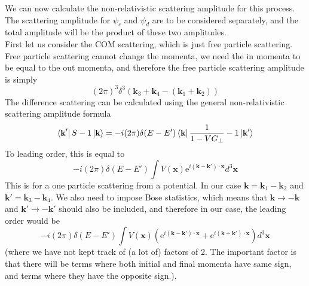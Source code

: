 \documentclass[11pt, notitlepage]{report}
\newcommand{\e}{\mathrm{e}}
\numberwithin{equation}{section}
\begin{document}
    We can now calculate the non-relativistic scattering amplitude for this process. The scattering amplitude for \(\psi_c\) and \(\psi_d\) are to be considered separately, and the total amplitude will be the product of these two amplitudes. \\
    First let us consider the COM scattering, which is just free particle scattering. Free particle scattering cannot change the momenta, we need the in momenta to be equal to the out momenta, and therefore the free particle scattering amplitude is simply 
    \begin{equation*}
        (2\pi)^3\delta^3(\textbf{k}_3 +  \textbf{k}_4 - (\textbf{k}_1 + \textbf{k}_2))
    \end{equation*}
    The difference scattering can be calculated using the general non-relativistic scattering amplitude formula 
    \begin{equation*}
        \bra{\textbf{k}'}S-1\ket{\textbf{k}} = -i(2\pi)\delta(E - E') \bra{\textbf{k}} \frac{1}{1 - VG_\perp} -1 \ket{\textbf{k}'}
    \end{equation*}
    To leading order, this is equal to 
    \begin{equation*}
        -i(2\pi)\delta(E - E') \int V(\textbf{x}) \e^{i(\textbf{k} - \textbf{k}')\cdot \textbf{x}}d^3\textbf{x}
    \end{equation*}
    This is for a one particle scattering from a potential. In our case \(\textbf{k} = \textbf{k}_1 - \textbf{k}_2\) and \(\textbf{k}' = \textbf{k}_3 - \textbf{k}_4\). We also need to impose Bose statistics, which means that \(\textbf{k}\to -\textbf{k}\) and \(\textbf{k}' \to -\textbf{k}'\) should also be included, and therefore in our case, the leading order would be 
    \begin{equation*}
        -i(2\pi)\delta(E - E') \int V(\textbf{x}) \left( \e^{i(\textbf{k} - \textbf{k}') \cdot \textbf{x}} + \e^{i(\textbf{k} + \textbf{k}') \cdot \textbf{x}}\right)d^3\textbf{x}
    \end{equation*}
    (where we have not kept track of (a lot of) factors of 2. The important factor is that there will be terms where both initial and final momenta have same sign, and terms where they have the opposite sign.). \\
    
\end{document}
